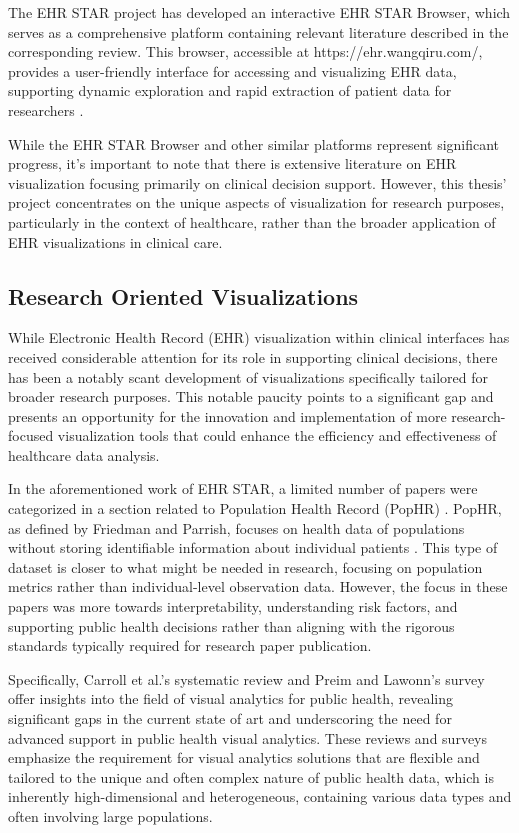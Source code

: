 The EHR STAR project has developed an interactive EHR STAR Browser, which serves as a comprehensive platform containing relevant literature described in the corresponding review. This browser, accessible at https://ehr.wangqiru.com/, provides a user-friendly interface for accessing and visualizing EHR data, supporting dynamic exploration and rapid extraction of patient data for researchers \cite{soa8}.

While the EHR STAR Browser and other similar platforms represent significant progress, it's important to note that there is extensive literature on EHR visualization focusing primarily on clinical decision support. However, this thesis' project concentrates on the unique aspects of visualization for research purposes, particularly in the context of healthcare, rather than the broader application of EHR visualizations in clinical care.

\subsection{Research Oriented Visualizations}\label{research-oriented-visualizations}

While Electronic Health Record (EHR) visualization within clinical interfaces has received considerable attention for its role in supporting clinical decisions, there has been a notably scant development of visualizations specifically tailored for broader research purposes. This notable paucity points to a significant gap and presents an opportunity for the innovation and implementation of more research-focused visualization tools that could enhance the efficiency and effectiveness of healthcare data analysis.

In the aforementioned work of EHR STAR, a limited number of papers were categorized in a section related to Population Health Record (PopHR) \cite{soa6}. PopHR, as defined by Friedman and Parrish, focuses on health data of populations without storing identifiable information about individual patients \cite{soa22}. This type of dataset is closer to what might be needed in research, focusing on population metrics rather than individual-level observation data. However, the focus in these papers was more towards interpretability, understanding risk factors, and supporting public health decisions rather than aligning with the rigorous standards typically required for research paper publication.

Specifically, Carroll et al.'s systematic review \cite{soa23} and Preim and Lawonn's survey \cite{soa12} offer insights into the field of visual analytics for public health, revealing significant gaps in the current state of art and underscoring the need for advanced support in public health visual analytics. These reviews and surveys emphasize the requirement for visual analytics solutions that are flexible and tailored to the unique and often complex nature of public health data, which is inherently high-dimensional and heterogeneous, containing various data types and often involving large populations.


